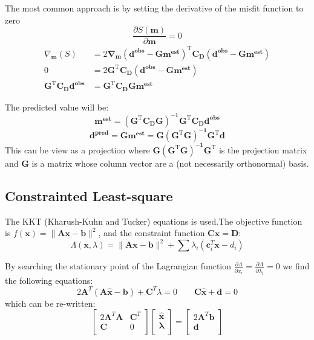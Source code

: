 \documentclass[twocolumn]{article}
\numberwithin{equation}{section}
\begin{document}
The most common approach is by setting the derivative of the misfit function to zero 
$$\frac{\partial S(\mathbf{m})}{\partial\mathbf{m}}=0$$
\begin{align*}
\nabla_\mathbf{m}(S) &=2\mathbf{ \nabla_\mathbf{m}(d^{obs}-Gm^{est})^\mathrm{T} C_D(d^{obs}-Gm^{est})} \\
					0&= 2\mathbf{G^\mathrm{T}C_D (d^{obs}-Gm^{est})}\\
					 \mathbf{G^\mathrm{T}C_Dd^{obs}}&=\mathbf{G^\mathrm{T}C_DGm^{est}}
\end{align*}



The predicted value will be:
$$  \mathbf{m^{est}=(G^\mathrm{T}C_DG)^{-1}G^\mathrm{T} C_D d^{obs} }$$
$$ \mathbf{d^{pred}=Gm^{est}=G(G^\mathrm{T}G)^{-1}G^\mathrm{T} d }$$
This can be view as a projection where $\mathbf{G(G^\mathrm{T}G)^{-1}G^\mathrm{T}}$ is the projection matrix and $\mathbf{G}$ is a matrix whose column vector  are a (not necessarily orthonormal) basis.

	\subsection{Constrainted Least-square}
The KKT (Kharush-Kuhn and Tucker) equations is used.The objective function is $f(\mathbf{x})=\|\mathbf{Ax-b}\|^2$, and the constraint function $\mathbf{Cx=D}$:
$$\Lambda(\mathbf{x},\lambda)=\|\mathbf{Ax-b}\|^2 + \sum \lambda_i( \mathbf{c}_i^T\mathbf{x}-d_i)$$

By searching the stationary point of the Lagrangian function $\frac{\partial \Lambda}{\partial x_i}=\frac{\partial \Lambda}{\partial \lambda_i}=0$ we find the following equations:
$$ 2\mathbf{A}^T(\mathbf{A\hat{x}-b})+\mathbf{C}^T\lambda =0 \qquad \mathbf{C\hat{x}+d}=0 $$
which can be re-written:
$$ \begin{bmatrix}
       2\mathbf{A}^T\mathbf{A} 	& \mathbf{C}^T \\
       \mathbf{C} 				& 0            \\
    \end{bmatrix} 
    \begin{bmatrix}
       \hat{\mathbf{x}}\\
       \mathbf{\lambda} 	\\
    \end{bmatrix}
    =
    \begin{bmatrix}
       2\mathbf{A}^T\mathbf{b}\\
       \mathbf{d} 	\\
    \end{bmatrix}
$$
\end{document}
